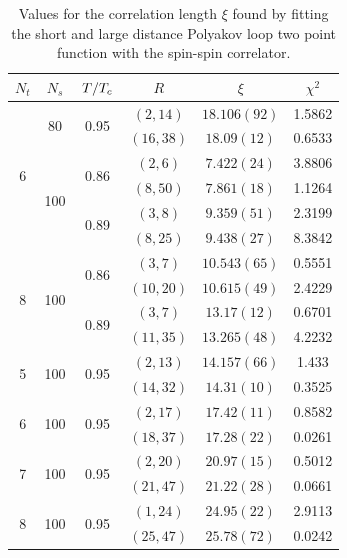 \documentclass[reqno,12pt]{article}
\numberwithin{equation}{section}
\begin{document}
\begin{table}[h]
	\centering
	\begin{tabular}{|c|c|c|c|c|c|}
		\hline
		$N_t$ & $N_s$ & $\flatfrac{T}{T_c} $ & $R$ & $\xi$ & $\chi^2$ \\
		\hline
		\multirow{6}{*}{6} 
			& \multirow{2}{*}{80}
				& \multirow{2}{*}{0.95}
					& $(2, 14)$  & $18.106(92)$ & 1.5862 \\
				& & & $(16, 38)$ & $18.09(12)$  & 0.6533 \\
			\cline{2-6}
			& \multirow{4}{*}{100} 
				& \multirow{2}{*}{0.86} 
					& $(2, 6)$   & $7.422(24)$ & 3.8806 \\
					& & & $(8, 50)$ & $7.861(18)$  & 1.1264 \\
					\cline{3-6}
				& & \multirow{2}{*}{0.89} 
					& $(3, 8)$   & $9.359(51)$ & 2.3199 \\
					& & & $(8, 25)$  & $9.438(27)$ & 8.3842 \\
		\hline
		\multirow{4}{*}{8} & \multirow{4}{*}{100}
				& \multirow{2}{*}{0.86}
					& $(3, 7)$  & $10.543(65)$ & 0.5551 \\
				& & & $(10, 20)$ & $10.615(49)$  & 2.4229 \\
			\cline{3-6}
				& & \multirow{2}{*}{0.89}
					& $(3, 7)$   & $13.17(12)$  & 0.6701 \\
				& & & $(11, 35)$ & $13.265(48)$ & 4.2232 \\
		\hline
		\multirow{2}{*}{5} & \multirow{2}{*}{100} & \multirow{2}{*}{0.95}
			    & $(2, 13)$ & $14.157(66)$ & 1.433 \\
			& & & $(14, 32)$ & $14.31(10)$ & 0.3525 \\
		\hline
		\multirow{2}{*}{6} & \multirow{2}{*}{100} & \multirow{2}{*}{0.95}
			    & $(2, 17)$ & $17.42(11)$ & 0.8582 \\
			& & & $(18, 37)$ & $17.28(22)$ & 0.0261 \\
		\hline
		\multirow{2}{*}{7} & \multirow{2}{*}{100} & \multirow{2}{*}{0.95}
			    & $(2, 20)$ & $20.97(15)$ & 0.5012 \\
			& & & $(21, 47)$ & $21.22(28)$ & 0.0661 \\
		\hline
		\multirow{2}{*}{8} & \multirow{2}{*}{100} & \multirow{2}{*}{0.95}
			    & $(1, 24)$ & $24.95(22)$ & 2.9113 \\
			& & & $(25, 47)$ & $25.78(72)$ & 0.0242 \\
		\hline
	\end{tabular}
\caption[Fitted correlation length]{Values for the correlation length $\xi$ found by fitting the short and large distance
	Polyakov loop two point function with the spin-spin correlator.}
\label{table:corr_length}
\end{table}
\end{document}
